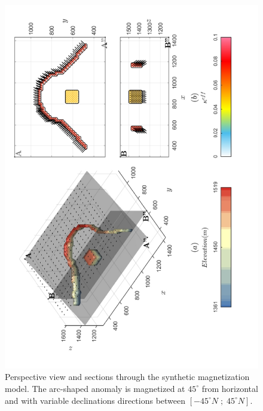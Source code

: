 \begin{figure}[h!]
\centering
\includegraphics[scale=0.52, angle =270]{3D_Model_REMANENT.pdf}
\caption{ Perspective view and sections through the synthetic magnetization model. The arc-shaped anomaly is magnetized at  $45^{\circ}$ from horizontal and with variable declinations directions between $[-45^{\circ}N \;;\;45^{\circ}N]$. }
\label{fig:3D_Model_REMANENT}
\end{figure}

